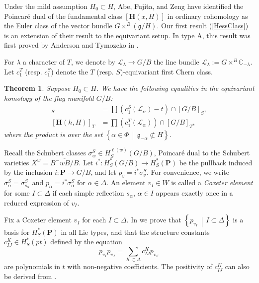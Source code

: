 \documentclass[10pt]{article}
\newtheorem{thm}{Theorem}
\numberwithin{thm}{section}
\theoremstyle{definition}
\theoremstyle{remark}
\newcommand{\Pet}{\ensuremath{\mathbf{P}}}
\newcommand{\Fl}{\ensuremath{G/B}}
\newcommand{\g}{\ensuremath{\mathfrak g}}
\newcommand{\Hess}{\mathbf H}
\newcommand{\IC}{\mathbb C}
\newcommand{\set}[2]{\left\{#1\,\middle\vert\,#2\right\}}
\begin{document}
Under the mild assumption $H_0\subset H$,
Abe, Fujita, and Zeng \cite[Cor. 3.9]{abe.fujita.zeng} have identified the Poincar\'e dual of the fundamental class $[\Hess(x,H)]$ in ordinary cohomology
as the Euler class of the vector bundle $G\times^B(\g/H)$.
Our first result (\cref{HessClass}) is an extension of their result to the equivariant setup.
In type A, this result was first proved by Anderson and Tymozcko in \cite{MR2609167}.

For $\lambda$ a character of $T$,
we denote by $\mathcal L_\lambda\to G/B$ the line bundle $\mathcal L_\lambda:=G\times^B\IC_{-\lambda}$.
Let $c_1^T$ (resp. $c_1^S$) denote the $T$ (resp. $S$)-equivariant first Chern class.

\begin{thm}
\label{intro:HessClass}
Suppose $H_0\subset H$.
We have the following equalities in the equivariant homology of the flag manifold $G/B$: 
\begin{align*}
[\Hess(e,H)]_S&=\prod\limits\left(c_1^S(\mathcal L_\alpha)-t\right)\cap[\Fl]_S,\\
[\Hess(h,H)]_T&=\prod\left(c_1^T(\mathcal L_\alpha)\right)\cap[\Fl]_T,
\end{align*}
where the product is over the set $\set{\alpha\in\Phi}{\g_{-\alpha}\not\subset H}$. 
\end{thm}

Recall the Schubert classes $\sigma^S_w\in H^{\ell(w)}_S(G/B)$,
Poincar\'e dual to the Schubert varieties $X^w=\overline{B^-wB/B}$.
Let $i^*:H_S^*(G/B)\to H_S^*(\Pet)$ be the pullback induced by the inclusion $i:\Pet\to G/B$,
and let $p_v=i^*\sigma^S_v$.
For convenience, we write $\sigma_\alpha^S=\sigma_{s_\alpha}^S$ and $p_\alpha=i^*\sigma^S_\alpha$ for $\alpha\in\Delta$.
An element $v_I\in W$ is called a \emph{Coxeter element} for some $I\subset\Delta$
if each simple reflection $s_\alpha$, $\alpha\in I$ appears exactly once in a reduced expression of $v_I$.

Fix a Coxeter element $v_I$ for each $I\subset\Delta$.
In \cite{gms:peterson} we prove that $\set{p_{v_I}}{I\subset\Delta}$ is a basis for $H^*_S(\Pet)$ in all Lie types, and that the structure constants $c_{IJ}^K\in H_S^*(pt)$ defined by the equation
\begin{equation}\label{eq:pstruct}
p_{v_I}p_{v_J} = \sum_{K\subset \Delta} c_{IJ}^K p_{v_K}
\end{equation}
are polynomials in $t$ with non-negative coefficients.
The positivity of $c_{IJ}^K$ can also be derived from \cite{drellich:monk}.
\end{document}
